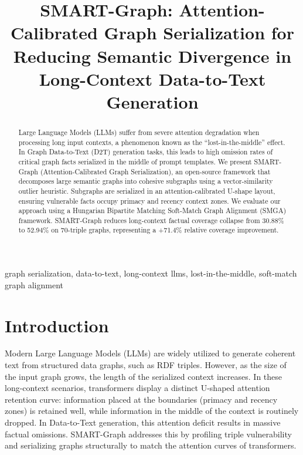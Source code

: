 \documentclass[conference]{IEEEtran}
\begin{document}
\title{SMART-Graph: Attention-Calibrated Graph Serialization for Reducing Semantic Divergence in Long-Context Data-to-Text Generation}

\author{
}

\maketitle

\begin{abstract}
Large Language Models (LLMs) suffer from severe attention degradation when processing long input contexts, a phenomenon known as the ``lost-in-the-middle'' effect. In Graph Data-to-Text (D2T) generation tasks, this leads to high omission rates of critical graph facts serialized in the middle of prompt templates. We present SMART-Graph (Attention-Calibrated Graph Serialization), an open-source framework that decomposes large semantic graphs into cohesive subgraphs using a vector-similarity outlier heuristic. Subgraphs are serialized in an attention-calibrated U-shape layout, ensuring vulnerable facts occupy primacy and recency context zones. We evaluate our approach using a Hungarian Bipartite Matching Soft-Match Graph Alignment (SMGA) framework. SMART-Graph reduces long-context factual coverage collapse from 30.88\% to 52.94\% on 70-triple graphs, representing a +71.4\% relative coverage improvement.
\end{abstract}

\begin{IEEEkeywords}
graph serialization, data-to-text, long-context llms, lost-in-the-middle, soft-match graph alignment
\end{IEEEkeywords}

\section{Introduction}
Modern Large Language Models (LLMs) are widely utilized to generate coherent text from structured data graphs, such as RDF triples. However, as the size of the input graph grows, the length of the serialized context increases. In these long-context scenarios, transformers display a distinct U-shaped attention retention curve: information placed at the boundaries (primacy and recency zones) is retained well, while information in the middle of the context is routinely dropped. In Data-to-Text generation, this attention deficit results in massive factual omissions. SMART-Graph addresses this by profiling triple vulnerability and serializing graphs structurally to match the attention curves of transformers.
\end{document}
